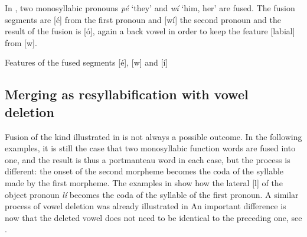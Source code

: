 \documentclass[output=paper]{langscibook}
\begin{document}
In , two monosyllabic pronouns \textit{pé} ‘they’ and \textit{wí} ‘him, her’ are fused. The fusion segments are [é] from the first pronoun and [wí] the second pronoun and the result of the fusion is [ó], again a back vowel in order to keep the feature [labial] from [w]. 

\pagebreak 

\begin{exe}
\ex Features of the fused segments [é], [w] and [í]\label{ex:traore:39}\\
\end{exe}
 

\subsection{Merging as resyllabification with vowel deletion}
\label{sec:traore:merging_as_resyll_with_vowel_deletion:4b}
Fusion of the kind illustrated in  is not always a possible outcome. In the following examples, it is still the case that two monosyllabic function words are fused into one, and the result is thus a portmanteau word in each case, but the process is different: the onset of the second morpheme becomes the coda of the syllable made by the first morpheme. The examples in  show how the lateral [l] of the object pronoun \textit{lí} becomes the coda of the syllable of the first pronoun. A similar process of vowel deletion was already illustrated in  An important difference is now that the deleted vowel does not need to be identical to the preceding one, see .
\end{document}
